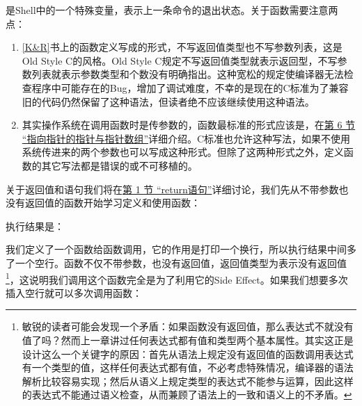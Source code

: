 

是Shell中的一个特殊变量，表示上一条命令的退出状态。关于函数需要注意两点：


\begin{enumerate}

\item \hyperlink{db.bi01.bibli.kr}{[K\&R]}书上的函数定义写成的形式，不写返回值类型也不写参数列表，这是Old Style C的风格。Old Style C规定不写返回值类型就表示返回型，不写参数列表就表示参数类型和个数没有明确指出。这种宽松的规定使编译器无法检查程序中可能存在的Bug，增加了调试难度，不幸的是现在的C标准为了兼容旧的代码仍然保留了这种语法，但读者绝不应该继续使用这种语法。

\item 其实操作系统在调用函数时是传参数的，函数最标准的形式应该是，在\hyperlink{db.ch23s06.id2812522}{第 6 节 “指向指针的指针与指针数组”}详细介绍。C标准也允许这种写法，如果不使用系统传进来的两个参数也可以写成这种形式。但除了这两种形式之外，定义函数的其它写法都是错误的或不可移植的。
\end{enumerate}


关于返回值和语句我们将在\hyperlink{db.ch05s01.id2721598}{第 1 节 “return语句”}详细讨论，我们先从不带参数也没有返回值的函数开始学习定义和使用函数：





执行结果是：




我们定义了一个函数给函数调用，它的作用是打印一个换行，所以执行结果中间多了一个空行。函数不仅不带参数，也没有返回值，返回值类型为表示没有返回值\footnote[4]{敏锐的读者可能会发现一个矛盾：如果函数没有返回值，那么表达式不就没有值了吗？然而上一章讲过任何表达式都有值和类型两个基本属性。其实这正是设计这么一个关键字的原因：首先从语法上规定没有返回值的函数调用表达式有一个类型的值，这样任何表达式都有值，不必考虑特殊情况，编译器的语法解析比较容易实现；然后从语义上规定类型的表达式不能参与运算，因此这样的表达式不能通过语义检查，从而兼顾了语法上的一致和语义上的不矛盾。}，这说明我们调用这个函数完全是为了利用它的Side Effect。如果我们想要多次插入空行就可以多次调用函数：


